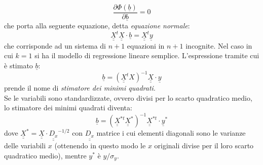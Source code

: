 \documentclass[]{article}
\def\doubleunderline#1{\underline{\underline{#1}}}
\begin{document}
\begin{equation}
\frac{\partial \Phi(\underline{b})}{\partial \underline{b}} = 0
\end{equation}
che porta alla seguente equazione, detta \textit{equazione normale}:
\begin{equation}
\doubleunderline{X}^t \doubleunderline{X} \cdot \underline{b} = \doubleunderline{X}^t \underline{y}
\end{equation}
che corrisponde ad un sistema di $n+1$ equazioni in $n+1$ incognite. Nel caso in cui $k = 1$ si ha il modello di regressione lineare semplice. L'espressione tramite cui è stimato $\underline{b}$:
\begin{equation}
\underline{b} = (\doubleunderline{X}^t X)^{-1} \doubleunderline{X} \cdot \underline{y}
\end{equation}
prende il nome di \textit{stimatore dei minimi quadrati}.\\
Se le variabili sono standardizzate, ovvero divisi per lo scarto quadratico medio, lo stimatore dei minimi quadrati diventa:
\begin{equation}
\underline{b} = (\doubleunderline{X}^{*t} \doubleunderline{X}^*)^{-1} \doubleunderline{X}^{*t} \cdot \underline{y}^*
\end{equation}
dove $\doubleunderline{X}^* = \doubleunderline{X} \cdot \doubleunderline{D_x}^{-1/2}$ con $\doubleunderline{D_x}$ matrice i cui elementi diagonali sono le varianze delle variabili $x$ (ottenendo in questo modo le $x$ originali divise per il loro scarto quadratico medio), mentre $y^*$ è $y/\sigma_y$.
\end{document}
